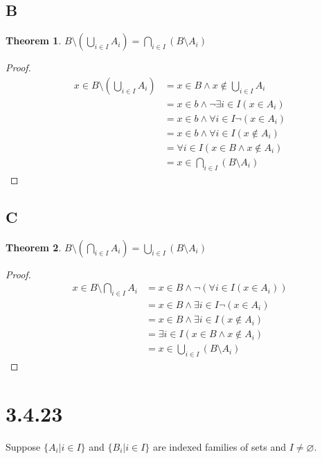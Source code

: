 \documentclass{article}
\newtheorem*{theorem}{Theorem}  %
\begin{document}
\subsection*{B}
\begin{theorem} $B \setminus (\bigcup_{i \in I} A_{i}) = \bigcap_{i \in I} (B \setminus A_{i})$
\end{theorem}
\begin{proof}
\begin{align*}
x \in B \setminus (\bigcup_{i \in I} A_{i}) &= x \in B \land x \notin \bigcup_{i \in I} A_{i} \\
&= x \in b \land \neg \exists i \in I(x \in A_{i}) \\
&= x \in b \land \forall i \in I \neg (x \in A_{i}) \\
&= x \in b \land \forall i \in I(x \notin A_{i}) \\
&= \forall i \in I (x \in B \land x \notin A_{i}) \\
&= x \in \bigcap_{i \in I} (B \setminus A_{i})
\end{align*}
\end{proof}

\subsection*{C}
\begin{theorem} $ B \setminus \left( \bigcap_{i \in I} A_{i} \right) = \bigcup_{i \in I} (B \setminus A_{i})$
\end{theorem}
\begin{proof}
\begin{align*}
x \in B \setminus \bigcap_{i \in I} A_{i} &= x \in B \land \lnot (\forall i \in I (x \in A_{i})) \\
&= x \in B \land \exists i \in I \lnot (x \in A_{i}) \\
&= x \in B \land \exists i \in I (x \notin A_{i}) \\
&= \exists i \in I ( x \in B \land x \notin A_{i} ) \\
&= x \in \bigcup_{i \in I} (B \setminus A_{i})
\end{align*}
\end{proof}

\section*{3.4.23}  
Suppose $\{ A_{i} | i \in I\}$ and $\{B_{i} | i \in I\}$ are indexed families of sets and $I \neq \varnothing$.
\end{document}
